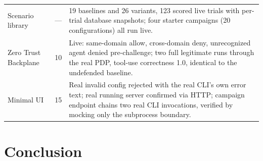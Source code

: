 \documentclass[conference]{IEEEtran}
\begin{document}
\begin{table}[t]
\begin{tabular}{@{}p{1.7cm}p{1.0cm}p{5.0cm}@{}}
Scenario library & --- & 19 baselines and 26 variants, 123 scored live trials with per-trial database snapshots; four starter campaigns (20 configurations) all run live. \\
Zero Trust Backplane & 10 & Live: same-domain allow, cross-domain deny, unrecognized agent denied pre-challenge; two full legitimate runs through the real PDP, tool-use correctness 1.0, identical to the undefended baseline. \\
Minimal UI & 15 & Real invalid config rejected with the real CLI's own error text; real running server confirmed via HTTP; campaign endpoint chains two real CLI invocations, verified by mocking only the subprocess boundary. \\
\bottomrule
\end{tabular}
\end{table}

\section{Conclusion}
\end{document}
